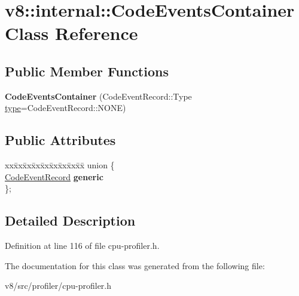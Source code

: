 \hypertarget{classv8_1_1internal_1_1CodeEventsContainer}{}\section{v8\+:\+:internal\+:\+:Code\+Events\+Container Class Reference}
\label{classv8_1_1internal_1_1CodeEventsContainer}
\subsection*{Public Member Functions}
\begin{DoxyCompactItemize}
\item 
\mbox{\label{classv8_1_1internal_1_1CodeEventsContainer_a577663fbea6f921aa1a7054eaf4c98b1}} 
{\bfseries Code\+Events\+Container} (Code\+Event\+Record\+::\+Type \mbox{\hyperlink{classstd_1_1conditional_1_1type}{type}}=Code\+Event\+Record\+::\+N\+O\+NE)
\end{DoxyCompactItemize}
\subsection*{Public Attributes}
\begin{DoxyCompactItemize}
\item 
\mbox{\label{classv8_1_1internal_1_1CodeEventsContainer_a0c57d681bc58967a996b6ca0c754a489}} 
\begin{tabbing}
xx\=xx\=xx\=xx\=xx\=xx\=xx\=xx\=xx\=\kill
union \{\\
\>\mbox{\hyperlink{classv8_1_1internal_1_1CodeEventRecord}{CodeEventRecord}} {\bfseries generic}\\
\}; \\

\end{tabbing}\end{DoxyCompactItemize}


\subsection{Detailed Description}


Definition at line 116 of file cpu-\/profiler.\+h.



The documentation for this class was generated from the following file\+:\begin{DoxyCompactItemize}
\item 
v8/src/profiler/cpu-\/profiler.\+h\end{DoxyCompactItemize}
